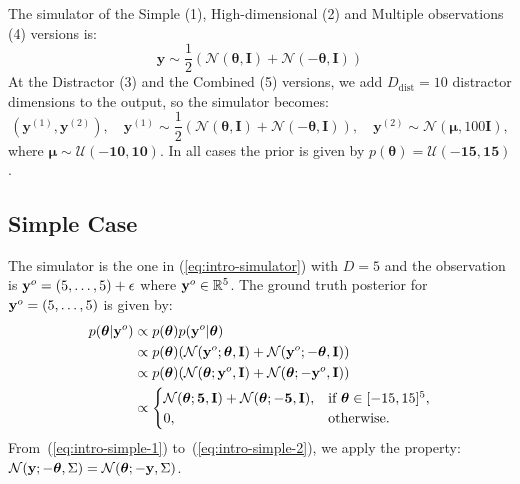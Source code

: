 The simulator of the Simple (1), High-dimensional (2) and Multiple observations (4) versions is:
\begin{equation}
  \label{eq:intro-simulator}
  \mathbf{y} \sim \frac{1}{2} \left( \mathcal{N}(\boldsymbol{\theta}, \mathbf{I}) + \mathcal{N}(-\boldsymbol{\theta}, \mathbf{I}) \right)
\end{equation}
%
At the Distractor (3) and the Combined (5) versions, we add $D_{\text{dist}} = 10$ distractor dimensions to the output, so the simulator becomes:
\begin{equation}
  \label{eq:intro-simulator-distractor}
  (\mathbf{y}^{(1)}, \mathbf{y}^{(2)}), \quad \mathbf{y}^{(1)} \sim \frac{1}{2} \left( \mathcal{N}(\boldsymbol{\theta}, \mathbf{I}) + \mathcal{N}(-\boldsymbol{\theta}, \mathbf{I}) \right), \quad \mathbf{y}^{(2)} \sim \mathcal{N}(\boldsymbol{\mu}, 100 \mathbf{I}),
\end{equation}
%
where $\boldsymbol{\mu} \sim \mathcal{U}(-\mathbf{10}, \mathbf{10})$.
In all cases the prior is given by \(p(\boldsymbol{\theta}) = \mathcal{U}(\mathbf{-15}, \mathbf{15}) \).

\subsection{Simple Case}

The simulator is the one in (\ref{eq:intro-simulator}) with $D = 5$ and
the observation is $\mathbf{y}^o = (5, \ldots, 5) + \epsilon$ where $\mathbf{y}^o \in \mathbb{R}^5$.
The ground truth posterior for $\mathbf{y}^o = (5, \ldots, 5)$ is given by:
\begin{align}
  p(\boldsymbol{\theta} | \mathbf{y}^o)
  &\propto p(\boldsymbol{\theta}) p(\mathbf{y}^o | \boldsymbol{\theta}) \\
  &\propto p(\boldsymbol{\theta}) ( \mathcal{N}(\mathbf{y}^o; \boldsymbol{\theta}, \mathbf{I}) + \mathcal{N}(\mathbf{y}^o; -\boldsymbol{\theta}, \mathbf{I}) ) \label{eq:intro-simple-1} \\
  &\propto p(\boldsymbol{\theta}) ( \mathcal{N}(\boldsymbol{\theta}; \mathbf{y}^o, \mathbf{I}) + \mathcal{N}(\boldsymbol{\theta}; -\mathbf{y}^o, \mathbf{I}) ) \label{eq:intro-simple-2} \\
  &\propto
    \begin{cases}
      \mathcal{N}(\boldsymbol{\theta}; \mathbf{5}, \mathbf{I}) + \mathcal{N}(\boldsymbol{\theta}; -\mathbf{5}, \mathbf{I}), & \text{if } \boldsymbol{\theta} \in [-15, 15]^5, \\
      0, & \text{otherwise}.
    \end{cases}
    \label{eq:intro-simple}
\end{align}
%
From~(\ref{eq:intro-simple-1}) to~(\ref{eq:intro-simple-2}), we apply the property: $\mathcal{N}(\mathbf{y}; - \boldsymbol{\theta}, \Sigma) = \mathcal{N}(\boldsymbol{\theta}; - \mathbf{y} , \Sigma)$.


